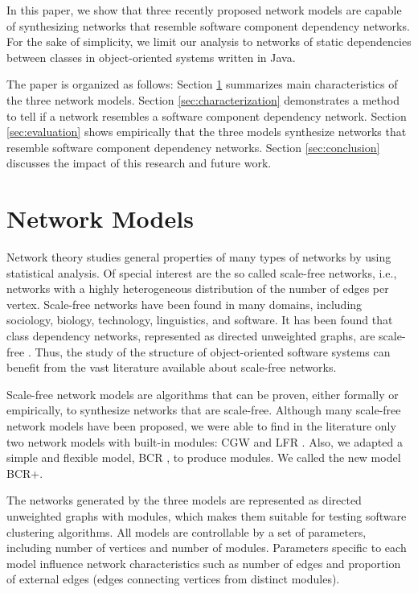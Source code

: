 In this paper, we show that three recently proposed network models are capable
of synthesizing networks that resemble software component dependency networks.
For the sake of simplicity, we limit our analysis to networks of static
dependencies between classes in object-oriented systems written in Java.

The paper is organized as follows: Section \ref{sec:models} summarizes main
characteristics of the three network models.
%
Section \ref{sec:characterization} demonstrates a method to tell if a network
resembles a software component dependency network.
%
Section \ref{sec:evaluation} shows empirically that the three models synthesize
networks that resemble software component dependency networks.
%
Section \ref{sec:conclusion} discusses the impact of this research and future
work.


\section{Network Models} \label{sec:models} 

Network theory studies general properties of many types of networks by using
statistical analysis. Of special interest are the so called scale-free
networks, i.e., networks with a highly heterogeneous distribution of the number
of edges per vertex. Scale-free networks have been found in many domains,
including sociology, biology, technology, linguistics, and software. It has
been found that class dependency networks, represented as directed unweighted
graphs, are scale-free \cite{Myers2003}. Thus, the study of the structure of
object-oriented software systems can benefit from the vast literature available
about scale-free networks.

Scale-free network models are algorithms that can be proven, either formally or
empirically, to synthesize networks that are scale-free. Although many
scale-free network models have been proposed, we were able to find in the
literature only two network models with built-in modules: CGW \cite{Chen2008}
and LFR \cite{Lancichinetti2009}. Also, we adapted a simple and flexible model,
BCR \cite{Bollobas2003}, to produce modules. We called the new model BCR+.

The networks generated by the three models are represented as directed
unweighted graphs with modules, which makes them suitable for testing software
clustering algorithms. All models are controllable by a set of parameters,
including number of vertices and number of modules. Parameters specific to each
model influence network characteristics such as number of edges and proportion
of external edges (edges connecting vertices from distinct modules).

